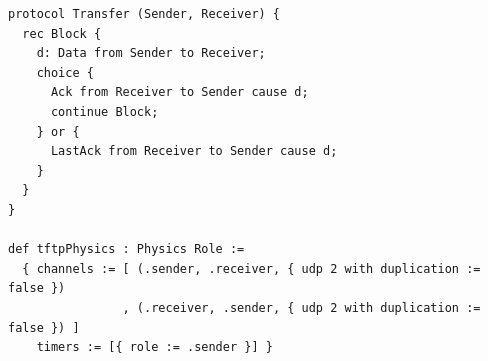 \begin{lstlisting}[language={}]
protocol Transfer (Sender, Receiver) {
  rec Block {
    d: Data from Sender to Receiver;
    choice {
      Ack from Receiver to Sender cause d;
      continue Block;
    } or {
      LastAck from Receiver to Sender cause d;
    }
  }
}

def tftpPhysics : Physics Role :=
  { channels := [ (.sender, .receiver, { udp 2 with duplication := false })
                , (.receiver, .sender, { udp 2 with duplication := false }) ]
    timers := [{ role := .sender }] }
\end{lstlisting}

